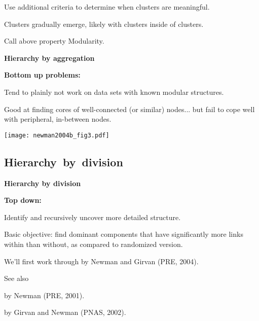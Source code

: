         Use additional criteria to determine
        when clusters are meaningful.
      
    
      Clusters gradually emerge, likely with clusters inside
      of clusters.
     
      Call above property \alert{Modularity}.
    
    
  


  \textbf{Hierarchy by aggregation}

  \textbf{Bottom up problems:}
    
    
      Tend to plainly not work on data sets
      with known modular structures.
    
      Good at finding cores of well-connected
      (or similar) nodes...  but fail to
      cope well with peripheral, in-between nodes.
              
        
        \texttt{[image: newman2004b\_fig3.pdf]}
          
  


\subsection{Hierarchy\ by\ division}

  \textbf{Hierarchy by division}

  \textbf{Top down:}
    
     
      Identify  and recursively
      uncover more detailed structure.
    
      \alert{Basic objective:} find dominant components
      that have significantly more links within than without, as compared
      to randomized version.
    
      We'll first work through 
      by Newman and Girvan (PRE, 2004).\cite{newman2004b}
    
      See also 
      
      
        by Newman (PRE, 2001).\cite{newman2001d,newman2006e}
       
        by Girvan and Newman (PNAS, 2002).\cite{girvan2002a} 
      
    
    
